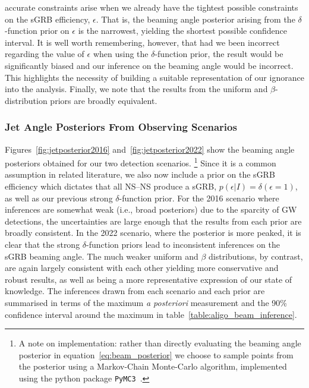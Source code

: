 \documentclass[twocolumn,nofootinbib]{revtex4-1}
\newcommand{\BNS}{\ac{NS}--\ac{NS}\xspace}
\begin{document}
accurate constraints arise when we already have the tightest possible
constraints on the \ac{sGRB} efficiency, $\epsilon$.  That is, the
beaming angle posterior arising from the $\delta$-function prior on
$\epsilon$ is the narrowest, yielding the shortest possible confidence
interval.  It is well worth remembering, however, that had we been
incorrect regarding the value of $\epsilon$ when using the
$\delta$-function prior, the result would be significantly biased and
our inference on the beaming angle would be incorrect.  This
highlights the necessity of building a suitable representation of our
ignorance into the analysis.  Finally, we note that the results from
the uniform and $\beta$-distribution priors are broadly equivalent.


\subsubsection{Jet Angle Posteriors From Observing Scenarios}
Figures~\ref{fig:jetposterior2016} and~\ref{fig:jetposterior2022} show
the beaming angle posteriors obtained for our two detection scenarios.
\footnote{A note on implementation: rather than directly evaluating
  the beaming angle posterior in equation~\ref{eq:beam_posterior} we
  choose to sample points from the posterior using a Markov-Chain
  Monte-Carlo algorithm, implemented using the python package
  \texttt{PyMC3}~\cite{salvatier2016probabilistic}.}
Since it is a common assumption in related literature, we also now
include a prior on the \ac{sGRB} efficiency which dictates that all
\BNS produce a \ac{sGRB}, $p(\epsilon|I)=\delta(\epsilon=1)$, as well
as our previous strong $\delta$-function prior.  For the 2016 scenario
where inferences are somewhat weak (i.e., broad posteriors) due to the
sparcity of \ac{GW} detections, the uncertainties are large enough
that the results from each prior are broadly consistent.  In the 2022
scenario, where the posterior is more peaked, it is clear that the
strong $\delta$-function priors lead to inconsistent inferences on the
\ac{sGRB} beaming angle.  The much weaker uniform and $\beta$
distributions, by contrast, are again largely consistent with each
other yielding more conservative and robust results, as well as being
a more representative expression of our state of knowledge.  The
inferences drawn from each scenario and each prior are summarised in
terms of the maximum \emph{a posteriori} measurement and the 90\%
confidence interval around the maximum in
table~\ref{table:aligo_beam_inference}.
\end{document}
